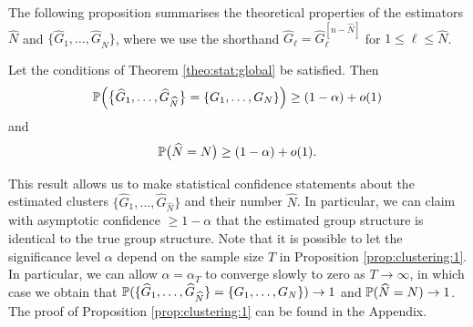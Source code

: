 \documentclass[a4paper,12pt]{article}
\begin{document}
\newpage
The following proposition summarises the theoretical properties of the estimators $\widehat{N}$ and $\{ \widehat{G}_1,\ldots,\widehat{G}_{\widehat{N}} \}$, where we use the shorthand $\widehat{G}_\ell = \widehat{G}_\ell^{[n-\widehat{N}]}$ for $1 \le \ell \le \widehat{N}$. 
\begin{prop}\label{prop:clustering:1}
Let the conditions of Theorem \ref{theo:stat:global} be satisfied. Then 
\[ \mathbb{P} \Big( \big\{ \widehat{G}_1,\ldots,\widehat{G}_{\widehat{N}} \big\} = \{ G_1,\ldots, G_N \} \Big) \ge (1-\alpha) + o(1) \]
and 
\[ \mathbb{P} \big( \widehat{N} = N \big) \ge (1-\alpha) + o(1). \]
\end{prop}
This result allows us to make statistical confidence statements about the estimated clusters $\{ \widehat{G}_1,\ldots,\widehat{G}_{\widehat{N}} \}$ and their number $\widehat{N}$. In particular, we can claim with asymptotic confidence $\ge 1 - \alpha$ that the estimated group structure is identical to the true group structure. Note that it is possible to let the significance level $\alpha$ depend on the sample size $T$ in Proposition \ref{prop:clustering:1}. In particular, we can allow $\alpha = \alpha_T$ to converge slowly to zero as $T \rightarrow \infty$, in which case we obtain that $\mathbb{P} ( \{ \widehat{G}_1,\ldots,\widehat{G}_{\widehat{N}} \} = \{ G_1,\ldots, G_N \} ) \rightarrow 1$ and $\mathbb{P} ( \widehat{N} = N ) \rightarrow 1$. The proof of Proposition \ref{prop:clustering:1} can be found in the Appendix.
\end{document}
